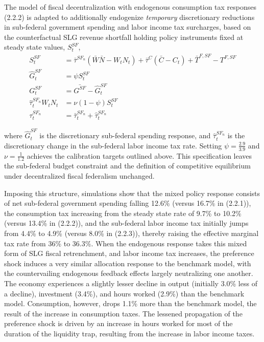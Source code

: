 \documentclass[12pt,letterpaper]{article}
\begin{document}
The model of fiscal decentralization with endogenous consumption tax responses (2.2.2) is adapted to additionally endogenize \textit{temporary} discretionary reductions in sub-federal government spending and labor income tax surcharges, based on the counterfactual SLG revenue shortfall holding policy instruments fixed at steady state values, $S^{SF}_t$,
\begin{align}
S^{SF}_t &= \bar{\tau}^{{SF}_n} (\bar{W} \bar{N} - W_t N_t) + \bar{\tau}^C (\bar{C} - C_t)+ \bar{T}^{F,SF} -T^{F,SF}  \\
\hat{G}^{SF}_t &= \psi S^{SF}_t \\
G^{SF}_t &=  \bar{G^{SF}} - \hat{G}^{SF}_t \\
\hat{\tau}^{{SF}_n}_t W_t N_t &=  \nu (1 - \psi) S^{SF}_t \\
\tau^{{SF}_n}_t &= \bar{\tau}^{{SF}_n}_t + \hat{\tau}^{{SF}_n}_t
\end{align}  

\noindent where $\hat{G}^{SF}_t$ is the discretionary sub-federal spending response, and $\hat{\tau}^{{SF}_n}_t$ is the discretionary change in the sub-federal labor income tax rate. Setting $\psi = \frac{2.9}{3.9}$ and $\nu = \frac{1}{1.2}$ achieves the calibration targets outlined above. This specification leaves the sub-federal budget constraint and the definition of competitive equilibrium under decentralized fiscal federalism unchanged.

Imposing this structure, simulations show that the mixed policy response consists of net sub-federal government spending falling 12.6\% (versus 16.7\% in (2.2.1)), the consumption tax increasing from the steady state rate of 9.7\% to 10.2\% (versus 13.4\% in (2.2.2)), and the sub-federal labor income tax initially jumps from 4.4\% to 4.9\% (versus 8.0\% in (2.2.3)), thereby raising the effective marginal tax rate from 36\% to 36.3\%. When the endogenous response takes this mixed form of SLG fiscal retrenchment, and labor income tax increases, the preference shock induces a very similar allocation response to the benchmark model, with the countervailing endogenous feedback effects largely neutralizing one another. The economy experiences a slightly lesser decline in output (initially 3.0\% less of a decline), investment (3.4\%), and hours worked (2.9\%) than the benchmark model. Consumption, however, drops 1.1\% more than the benchmark model, the result of the increase in consumption taxes. The lessened propagation of the preference shock is driven by an increase in hours worked for most of the duration of the liquidity trap, resulting from the increase in labor income taxes. 
\end{document}
